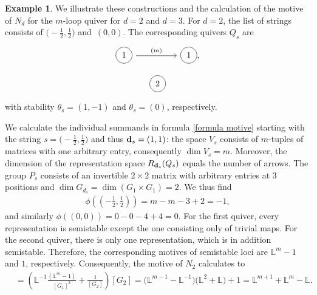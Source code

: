 \documentclass[10pt,a4paper]{amsart}
\newcommand\circlearound[1]{
 \tikz[baseline]\node[draw,shape=circle,anchor=base] {#1} ;}
\numberwithin{equation}{section}
\theoremstyle{definition}
\newtheorem{Example}[Theorem]{Example}
\begin{document}
\begin{Example}
We illustrate these constructions and the calculation of the motive of $N_{d}$ for the $m$-loop quiver for $d=2$ and $d=3$.
For $d=2$, the list of strings consists of
$\bigl(-\frac{1}{2}, \frac{1}{2}\bigr)$ and~$ (0,0)$. The corresponding quivers $Q_s$ are
\[\begin{tikzcd}
	\circlearound{1} && \circlearound{1}
	\arrow[from=1-1, to=1-3, "(m)"],
\end{tikzcd}\]
\[\begin{tikzcd}
	\circlearound{2}
\end{tikzcd}\]
with stability $\theta_s = (1,-1)$ and $\theta_s = (0)$, respectively.

We calculate the individual summands in formula \eqref{formula motive} starting with the string $s=\bigl(-\frac{1}{2}, \frac{1}{2}\bigr)$ and thus ${\bf d}_s = (1,1)$:
the space $V_s$ consists of $m$-tuples of matrices with one arbitrary entry, consequently $\dim V_s = m$. Moreover, the dimension of the representation space $R_{{\bf d}_s} (Q_s)$ equals the number of arrows. The group $P_s$ consists of an invertible $2\times 2$ matrix with arbitrary entries at $3$ positions and $\dim G_{d_s} = \dim (G_1 \times G_1) = 2$.
We thus find
\begin{align*}
\phi\left(\left(-\frac{1}{2}, \frac{1}{2}\right)\right) = m - m -3+2 = -1 ,
\end{align*}
and similarly
$
\phi ((0,0)) = 0-0-4+4 = 0 $.
For the first quiver, every representation is semistable except the one consisting only of trivial maps. For the second quiver, there is only one representation, which is in addition semistable. Therefore, the corresponding motives of semistable loci are $\mathbb{L}^m -1$ and $1$, respectively. Consequently, the motive of $N_2$ calculates to
\begin{align*}
[N_2] &= \left(\mathbb{L}^{-1} \frac{(\mathbb{L}^m -1)}{[G_1]^2}+ \frac{1}{[G_2]} \right) [G_2] = \bigl(\mathbb{L}^{m-1} - \mathbb{L}^{-1}\bigr) \bigl(\mathbb{L}^2 + \mathbb{L}\bigr) +1 = \mathbb{L}^{m+1} + \mathbb{L}^m - \mathbb{L} .
\end{align*}


\end{Example}
\end{document}
